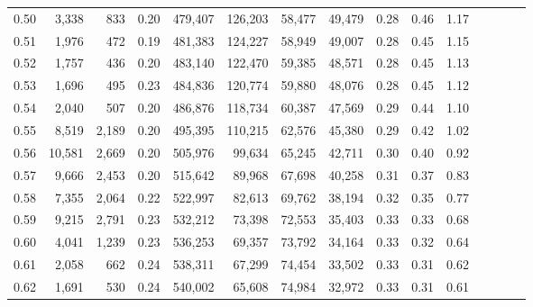 \begin{tabular}{rrrcrrrrrrrrrrr}
0.50 &   3,338 &    833 &                                       0.20 &  479,407 &  126,203 &   58,477 &   49,479 &  0.28 &  0.46 &                         1.17 \\
0.51 &   1,976 &    472 &                                       0.19 &  481,383 &  124,227 &   58,949 &   49,007 &  0.28 &  0.45 &                         1.15 \\
0.52 &   1,757 &    436 &                                       0.20 &  483,140 &  122,470 &   59,385 &   48,571 &  0.28 &  0.45 &                         1.13 \\
0.53 &   1,696 &    495 &                                       0.23 &  484,836 &  120,774 &   59,880 &   48,076 &  0.28 &  0.45 &                         1.12 \\
0.54 &   2,040 &    507 &                                       0.20 &  486,876 &  118,734 &   60,387 &   47,569 &  0.29 &  0.44 &                         1.10 \\
0.55 &   8,519 &  2,189 &                                       0.20 &  495,395 &  110,215 &   62,576 &   45,380 &  0.29 &  0.42 &                         1.02 \\
0.56 &  10,581 &  2,669 &                                       0.20 &  505,976 &   99,634 &   65,245 &   42,711 &  0.30 &  0.40 &                         0.92 \\
0.57 &   9,666 &  2,453 &                                       0.20 &  515,642 &   89,968 &   67,698 &   40,258 &  0.31 &  0.37 &                         0.83 \\
0.58 &   7,355 &  2,064 &                                       0.22 &  522,997 &   82,613 &   69,762 &   38,194 &  0.32 &  0.35 &                         0.77 \\
0.59 &   9,215 &  2,791 &                                       0.23 &  532,212 &   73,398 &   72,553 &   35,403 &  0.33 &  0.33 &                         0.68 \\
0.60 &   4,041 &  1,239 &                                       0.23 &  536,253 &   69,357 &   73,792 &   34,164 &  0.33 &  0.32 &                         0.64 \\
0.61 &   2,058 &    662 &                                       0.24 &  538,311 &   67,299 &   74,454 &   33,502 &  0.33 &  0.31 &                         0.62 \\
0.62 &   1,691 &    530 &                                       0.24 &  540,002 &   65,608 &   74,984 &   32,972 &  0.33 &  0.31 &                         0.61 \\

\end{tabular}
